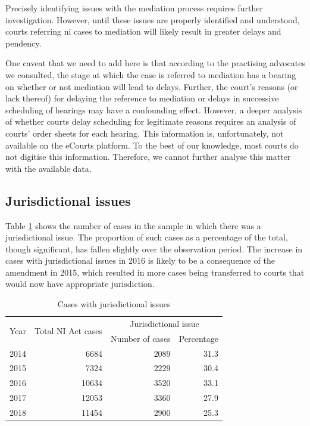 \documentclass[12pt,a4paper]{article}
\begin{document}
Precisely identifying issues with the mediation process requires further investigation. However, until these issues are properly identified and understood, courts referring \gls{ni} cases to mediation will likely result in greater delays and pendency.

One caveat that we need to add here is that according to the practising advocates we consulted, the stage at which the case is referred to mediation has a bearing on whether or not mediation will lead to delays. Further, the court's reasons (or lack thereof) for delaying the reference to mediation or delays in successive scheduling of hearings may have a confounding effect. However, a deeper analysis of whether courts delay scheduling for legitimate reasons requires an analysis of courts' order sheets for each hearing. This information is, unfortunately, not available on the eCourts platform. To the best of our knowledge, most courts do not digitise this information. Therefore, we cannot further analyse this matter with the available data.

\subsection{Jurisdictional issues}
\label{sec:jurisd-issu}

Table \ref{tab:jurisdiction_yearWise} shows the number of cases in the sample in which there was a jurisdictional issue. The proportion of such cases as a percentage of the total, though significant, has fallen slightly over the observation period. The increase in cases with jurisdictional issues in 2016 is likely to be a consequence of the amendment in 2015, which resulted in more cases being transferred to courts that would now have appropriate jurisdiction.

\begin{longtable}{@{}lrrr@{}}
 \caption{Cases with jurisdictional issues}\label{tab:jurisdiction_yearWise}\\
 \toprule
 \multirow{2}{*}{Year} & \multirow{2}{*}{Total NI Act cases} & \multicolumn{2}{c}{Jurisdictional issue}\\
 \cmidrule{3-4}
 && Number of cases & Percentage \\
 \midrule\endhead
 2014 & 6684 & 2089 & 31.3 \\
 2015 & 7324 & 2229 & 30.4 \\
 2016 & 10634 & 3520 & 33.1 \\
 2017 & 12053 & 3360 & 27.9 \\
 2018 & 11454 & 2900 & 25.3 \\
 \bottomrule
\end{longtable}
\end{document}
